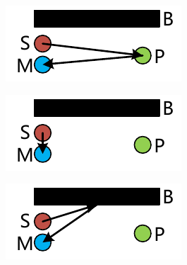 \begin{figure}
  \centering
  \begin{subfigure}[b]{0.49\textwidth}
    \includegraphics[width=\textwidth]{figure/signal-path-pen-hand-reflected-path}
    \caption{}
    \label{fig:signal-path-pen-hand-reflected-path}
  \end{subfigure}
  \begin{subfigure}[b]{0.49\textwidth}
    \includegraphics[width=\textwidth]{figure/signal-path-direct-path}
    \caption{}
    \label{fig:signal-path-direct-path}
  \end{subfigure}
  \begin{subfigure}[b]{0.49\textwidth}
    \includegraphics[width=\textwidth]{figure/signal-path-static-multipath}
    \caption{}
    \label{fig:signal-path-static-multipath}
  \end{subfigure}
  \begin{subfigure}[b]{0.49\textwidth}

\end{subfigure}
\end{figure}

